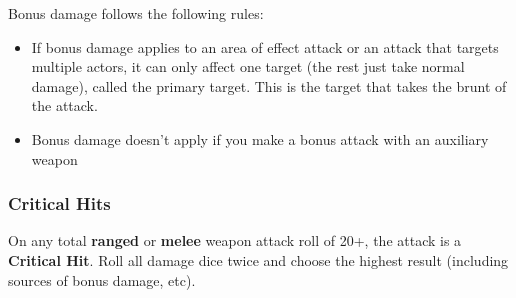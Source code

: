 Bonus damage follows the following rules:
\begin{itemize}
     \item If bonus damage applies to an area of effect attack or an attack that targets multiple actors, it can only affect one target (the rest just take normal damage), called the primary target. This is the target that takes the brunt of the attack.
     \item Bonus damage doesn’t apply if you make a bonus attack with an auxiliary weapon
\end{itemize}

\subsubsection{Critical Hits}
On any total \textbf{ranged} or \textbf{melee} weapon attack roll of 20+, the attack is a \textbf{Critical Hit}. Roll all damage dice twice and choose the highest result (including sources of bonus damage, etc).

